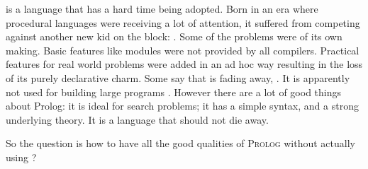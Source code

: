 \documentclass[thesis-solanki.tex]{subfiles}
\begin{document}
\begin{comment}
\par \progLang{Prolog} has a similar story. It was born in an era where procedural programming had made everyone notice their presence. Talking about 
competition, it was against something radical; the \progLang{C} programming language. The languages \progLang{C} has influenced is off the chart and 
so is the performance. It had paved the way for structured procedural programming and had given birth to the Unix operating system. Though the 
original version of \progLang{Prolog} has given rise to a large number of different flavours but a few drawbacks remain through the bloodline and as a 
result it did become the first choice. Some basic requirements such as modules are not provided by all compilers. To make it do real world stuff, a set of 
practical features are pushed in now and then which results in the loss of the purely declarative charm. The problem is that \progLang{Prolog} is fading 
away, \cite{website:prolog-steam,website:prolog-death,website:prolog-killer}, not many people use it and most of the times when it is used, the variant 
is usually \textit{practical} \progLang{Prolog} and the area being academia. It is not used for building large programs \cite{wikiprolog,somogyi1995
logic,website:prolog1000db}. But there are a lot of good things about \progLang{Prolog} that should not die away. Moreover, \progLang{Prolog} is ideal 
for search problems. 
\end{comment}

\par {} is a language that has a hard time being adopted. Born in an era where procedural languages were receiving a lot of 
attention, it suﬀered from competing against another new kid on the block: . Some of the problems were of its own making. Basic 
features like modules were not provided by all compilers. Practical features for real world problems were added in an ad hoc way resulting 
in the loss of its purely declarative charm. Some say that  is fading away, 
\cite{website:prolog-steam,website:prolog-death,website:prolog-killer}. It is apparently not used for building large programs 
\cite{wikiprolog,somogyi1995logic,website:prolog1000db}. However there are a lot of good things about Prolog: it is ideal for search 
problems; it has a simple syntax, and a strong underlying theory. It is a language that should not die away. 

\noindent So the question is how to have all the good qualities of \textsc{Prolog} without actually using ?  
\end{document}
